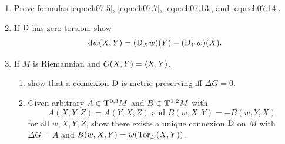 \documentclass[../main]{subfiles}
\begin{document}
\begin{enumerate}
    \item\label{pro:68} Prove formulas \eqref{eqn:ch07.5}, \eqref{eqn:ch07.7}, \eqref{eqn:ch07.13}, and \eqref{eqn:ch07.14}.
    
    \item\label{pro:69} If $\connection$ has zero torsion, show \[\dd w(X, Y) = (\connection_X w)(Y) - (\connection_Y w)(X).\]
    
    \item\label{pro:70} 
    If $M$ is Riemannian and $G(X, Y) = \ip X Y$,
    \begin{enumerate}[label=(\roman*)]
        \item show that a connexion $\connection$ is metric preserving iff $\Delta G = 0$.
        \item Given arbitrary $A\in\tensorbundle{M}{0}{ 3}$ and $B\in\tensorbundle{M}{1}{ 2}$ with \[A(X, Y, Z) = A(Y, X, Z)\text{ and }B(w, X, Y) = -B(w, Y, X)\] for all $w, X, Y, Z$, show there exists a unique connexion $\connection$ on $M$ with $\Delta G = A$ and $B(w, X, Y) = w(\Tor_D(X, Y))$. 
    \end{enumerate}
   

\end{enumerate}
\end{document}
